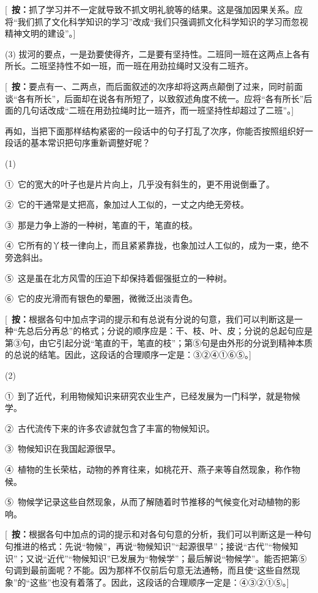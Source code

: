 [\ \textbf{按：}抓了学习并不一定就导致不抓文明礼貌等的结果。这是强加因果关系。应将“我们抓了文化科学知识的学习”改成“我们只强调抓文化科学知识的学习而忽视精神文明的建设”。]

(3) 拔河的要点，一是劲要使得齐，二是要有坚持性。二班同一班在这两点上各有所长。二班坚持性不如一班，而一班在用劲拉绳时又没有二班齐。

[\ \textbf{按：}要点有一、二两点，而后面叙述的次序却将这两点颠倒了过来，同时前面谈“各有所长”，后面却在说各有所短了，以致叙述角度不统一。应将“各有所长”后面的几句话改成“二班在用劲拉绳时比一班齐，而一班坚持性却超过了二班”。]

再如，当把下面那样结构紧密的一段话中的句子打乱了次序，你能否按照组织好一段话的基本常识把句序重新调整好呢？

(1)

①\ 它的宽大的叶子也是片片向上，几乎没有斜生的，更不用说倒垂了。

②\ 它的干通常是丈把高，象加过人工似的，一丈之内绝无旁枝。

③\ 那是力争上游的一种树，笔直的干，笔直的枝。

④\ 它所有的丫枝一律向上，而且紧紧靠拢，也象加过人工似的，成为一束，绝不旁逸斜出。

⑤\ 这是虽在北方风雪的压迫下却保持着倔强挺立的一种树。

⑥\ 它的皮光滑而有银色的晕圈，微微泛出淡青色。

[\ \textbf{按：}根据各句中加点字词的提示和有总说有分说的句意，我们可以判断这是一种“先总后分再总”的格式；分说的顺序应是：干、枝、叶、皮；分说的总起句应是第③句，由它引起分说“笔直的干，笔直的枝”；第⑤句是由外形的分说到精神本质的总说的结笔。因此，这段话的合理顺序一定是：③②④①⑥⑤。]

(2)

①\ 到了近代，利用物候知识来研究农业生产，已经发展为一门科学，就是物候学。

②\ 古代流传下来的许多农谚就包含了丰富的物候知识。

③\ 物候知识在我国起源很早。

④\ 植物的生长荣枯，动物的养育往来，如桃花开、燕子来等自然现象，称作物候。

⑤\ 物候学记录这些自然现象，从而了解随着时节推移的气候变化对动植物的影响。

[\ \textbf{按：}根据各句中加点的词的提示和对各句句意的分析，我们可以判断这是一种句句推进的格式：先说“物候”，再说“物候知识”“起源很早”；接说“古代”“物候知识”；又说“近代”“物候知识”已发展为“物候学”；最后解说“物候学”。能否把第⑤句调到最前面呢？不能。因为那样不仅前后句意无法通畅，而且使“这些自然现象”的“这些”也没有着落了。因此，这段话的合理顺序一定是：④③②①⑤。]
\newpage